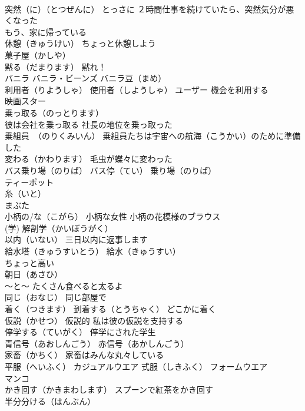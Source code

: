 \documentclass[8pt]{extreport}
\begin{document}
\begin{CJK}{UTF8}{min}
\\	突然（に）（とつぜんに） とっさに ２時間仕事を続けていたら、突然気分が悪くなった
\\	もう、家に帰っている
\\	休憩（きゅうけい） ちょっと休憩しよう
\\	菓子屋（かしや）
\\	黙る（だまります） 黙れ！
\\	バニラ バニラ・ビーンズ バニラ豆（まめ） 
\\	利用者（りようしゃ） 使用者（しようしゃ） ユーザー 機会を利用する
\\	映画スター
\\	乗っ取る（のっとります） 
\\	彼は会社を乗っ取る 社長の地位を乗っ取った
\\	乗組員　（のりくみいん） 乗組員たちは宇宙への航海（こうかい）のために準備した
\\	変わる（かわります） 毛虫が蝶々に変わった
\\	バス乗り場（のりば） バス停（てい） 乗り場（のりば）
\\	ティーポット
\\	糸（いと）
\\	まぶた
\\	小柄の/な（こがら） 小柄な女性 小柄の花模様のブラウス
\\	(学)	解剖学（かいぼうがく）
\\	以内（いない） 三日以内に返事します
\\	給水塔（きゅうすいとう） 給水（きゅうすい）
\\	ちょっと高い
\\	朝日（あさひ）
\\	～と～ たくさん食べると太るよ
\\	同じ（おなじ） 同じ部屋で
\\	着く（つきます） 到着する（とうちゃく） どこかに着く
\\	仮説（かせつ） 仮説的 私は彼の仮説を支持する
\\	停学する（ていがく） 停学にされた学生
\\	青信号（あおしんごう） 赤信号（あかしんごう）
\\	家畜（かちく） 家畜はみんな丸々している
\\	平服（へいふく） カジュアルウエア 式服（しきふく） フォームウエア
\\	マンコ
\\	かき回す（かきまわします） スプーンで紅茶をかき回す
\\	半分分ける（はんぶん）

\end{CJK}
\end{document}
